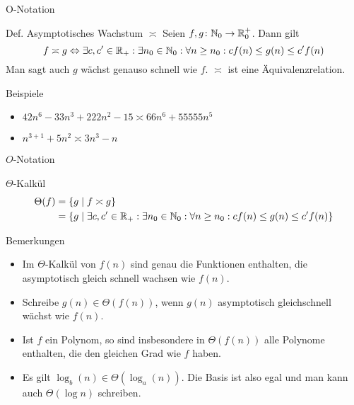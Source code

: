 \begin{frame}{O-Notation}
	\begin{block}{Def. Asymptotisches Wachstum $\asymp$}
		Seien $f,g \colon \mathbb{N}_0 \to \mathbb{R}^+_0$. Dann gilt
		\[
			f \asymp g \Leftrightarrow \exists c,c'\in \mathbb{R}_+: \exists n_0\in \mathbb{N}_0: \forall n\geq n_0: c f(n) \leq g(n) \leq c' f(n)
		\]
		Man sagt auch $g$ wächst genauso schnell wie $f$. $\asymp$ ist eine Äquivalenzrelation.
	\end{block}

	\begin{exampleblock}{Beispiele}
		\begin{itemize}
			\item $42n^6-33n^3+222n^2 -15 \asymp 66n^6+55555n^5$
			\item $n^{3+1}+5n^2\asymp 3n^3-n$
		\end{itemize}
	\end{exampleblock}
\end{frame}

\begin{frame}{$O$-Notation}
    \begin{block}{$\Theta$-Kalkül}
    	\begin{align*}
  			\Theta(f) &= \{ g \mid f \asymp g \} \\
  				   &= \{ g \mid \exists c,c'\in \mathbb{R}_+: \exists n_0\in \mathbb{N}_0: \forall  n\geq n_0: c f(n) \leq g(n) \leq c' f(n) \} 
		\end{align*}
    \end{block}

    \begin{exampleblock}{Bemerkungen}
    	\begin{itemize}
    		\item Im $\Theta$-Kalkül von $f(n)$ sind genau die Funktionen enthalten, die asymptotisch gleich schnell wachsen wie $f(n)$.
    		\item Schreibe $g(n) \in \Theta(f(n))$, wenn $g(n)$ asymptotisch gleichschnell wächst wie $f(n)$.
    		\item Ist $f$ ein Polynom, so sind insbesondere in $\Theta(f(n))$ alle Polynome enthalten, die den gleichen Grad wie $f$ haben.
    		\item Es gilt $\log_b(n) \in\Theta(\log_a(n))$. Die Basis ist also egal und man kann auch $\Theta(\log n)$ schreiben. %
    	\end{itemize}
    \end{exampleblock}
\end{frame}

